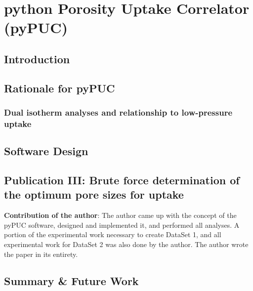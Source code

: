 \chapter{python Porosity Uptake Correlator (pyPUC)}
\label{ch:pyPUC}

\section{Introduction}

\section{Rationale for pyPUC}
\subsection{\texorpdfstring{Dual isotherm analyses and relationship to low-pressure  uptake}{Dual isotherm analyses and relationship to low-pressure CO2 uptake}}

\section{Software Design}

\newpage
\section[Publication III]{\texorpdfstring{Publication III: Brute force determination of the optimum pore sizes for
 uptake}{Publication III: Brute force determination of the optimum pore sizes for
CO2 uptake}}

\textbf{Contribution of the author}: The author came up with the concept of the pyPUC software, designed and implemented it, and performed all analyses. A portion of the experimental work necessary to create DataSet 1, and all experimental work for DataSet 2 was also done by the author. The author wrote the paper in its entirety.

\newpage

\setlength{\originalVOffset}{\voffset}   
\setlength{\originalHOffset}{\hoffset}

\setlength{\voffset}{0cm}
\setlength{\hoffset}{0cm}
%
\setlength{\voffset}{\originalVOffset}
\setlength{\hoffset}{\originalHOffset}

\section{Summary \& Future Work}

